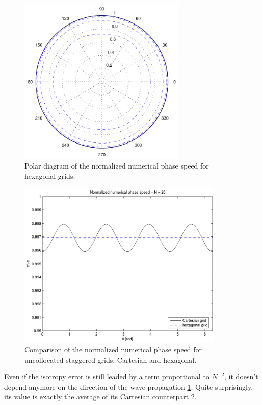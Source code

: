 \begin{figure}[htbp]
  \begin{center}
    \includegraphics[height=8cm]{pics/liu_fourier_fig5b}
  \end{center}
  \caption{Polar diagram of the normalized numerical phase speed for
  hexagonal grids.}
  \label{fig:numerical_c_polar_hex}
\end{figure}  

\begin{figure}[htbp]
  \begin{center}
    \includegraphics[height=8cm]{pics/liu_fourier_fig6}
  \end{center}
  \caption{Comparison of the normalized numerical phase speed for
  uncollocated staggered grids: Cartesian and hexagonal.}
  \label{fig:numerical_c_hex}
\end{figure}  

Even if the isotropy error is still leaded by a term proportional to
$N^{-2}$, it doesn't depend anymore on the direction of the wave
propagation \ref{fig:numerical_c_polar_hex}. Quite surprisingly, its
value is exactly the average of its Cartesian counterpart
\ref{fig:numerical_c_hex}.

